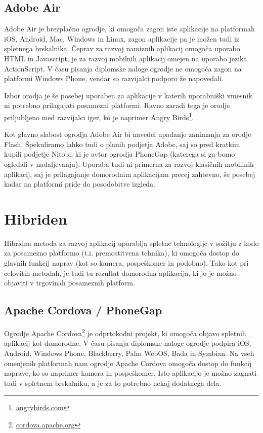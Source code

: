\subsection{Adobe Air}

Adobe Air je brezplačno ogrodje, ki omogoča zagon iste aplikacije na platformah iOS, Android, Mac, Windows in Linux, zagon aplikacije pa je možen tudi iz spletnega brskalnika. Čeprav za razvoj namiznih aplikacij omogoča uporabo HTML in Javascript, je za razvoj mobilnih aplikacij omejen na uporabo jezika ActionScript. V času pisanja diplomske naloge ogrodje ne omogoča zagon na platformi Windows Phone, vendar so razvijalci podporo že napovedali.

Izbor orodja je še posebej uporaben za aplikacije v katerih uporabniški vmesnik ni potrebno prilagajati posamezni platformi. Ravno zaradi tega je orodje priljubljeno med razvijalci iger, ko je naprimer Angry Birds\footnote{\href{https://www.angrybirds.com}{angrybirds.com}}.

Kot glavno slabost ogrodja Adobe Air bi navedel upadanje zanimanja za orodje Flash. Špekuliramo lahko tudi o planih podjetja Adobe, saj so pred kratkim kupili podjetje Nitobi, ki je avtor ogrodja PhoneGap (katerega si ga bomo ogledali v nadaljevanju). Uporaba tudi ni primerna za razvoj klasičnih mobilinih aplikacij, saj je prilagajanje domorodnim aplikacijam precej zahtevno, še posebej kadar na platformi pride do posodobitve izgleda.

\section{Hibriden}

Hibridna metoda za razvoj aplikacij uporablja spletne tehnologije v sožitju z kodo za posamezno platformo (t.i. premostitvena tehnika), ki omogoča dostop do glavnih funkcij naprav (kot so kamera, pospeškomer in podobno). Tako kot pri celovitih metodah, je tudi tu rezultat domorodna aplikacija, ki jo je možno objaviti v trgovinah posameznih platform.

\subsection{Apache Cordova / PhoneGap}

Ogrodje Apache Cordova\footnote{\href{http://cordova.apache.org}{cordova.apache.org}} je odprtokodni projekt, ki omogoča objavo spletnih aplikacij kot domorodne. V času pisanja diplomske naloge ogrodje podpira iOS, Android, Windows Phone, Blackberry, Palm WebOS, Bada in Symbian. Na vseh omenjenih platformah nam ogrodje Apache Cordova omogoča dostop do funkcij naprave, ko so naprimer kamera in pospeškomer. Isto aplikacijo je možno zagnati tudi v spletnem brskalniku, a je za to potrebno nekaj dodatnega dela.

